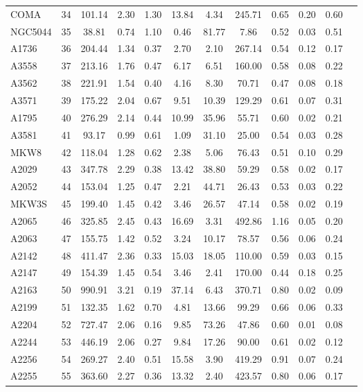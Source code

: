 \documentclass[10pt,aps,pra,reprint,amsmath,amsfonts,amssymb,showpacs,nofootinbib,floatfix]{revtex4-1}
\begin{document}
\begin{table}
\begin{minipage}{2.0\columnwidth}
\begin{tabular}{l  c c c c c c c c c c c}
$$COMA     &  34 & 101.14 &   2.30 &   1.30 &  13.84 &   4.34 & 245.71 &   0.65 &   0.20 &   0.60 \\
NGC5044  &  35 &  38.81 &   0.74 &   1.10 &   0.46 &  81.77 &   7.86 &   0.52 &   0.03 &   0.51 \\
A1736    &  36 & 204.44 &   1.34 &   0.37 &   2.70 &   2.10 & 267.14 &   0.54 &   0.12 &   0.17 \\
A3558    &  37 & 213.16 &   1.76 &   0.47 &   6.17 &   6.51 & 160.00 &   0.58 &   0.08 &   0.22 \\
A3562    &  38 & 221.91 &   1.54 &   0.40 &   4.16 &   8.30 &  70.71 &   0.47 &   0.08 &   0.18 \\
A3571    &  39 & 175.22 &   2.04 &   0.67 &   9.51 &  10.39 & 129.29 &   0.61 &   0.07 &   0.31 \\
A1795    &  40 & 276.29 &   2.14 &   0.44 &  10.99 &  35.96 &  55.71 &   0.60 &   0.02 &   0.21 \\
A3581    &  41 &  93.17 &   0.99 &   0.61 &   1.09 &  31.10 &  25.00 &   0.54 &   0.03 &   0.28 \\
MKW8     &  42 & 118.04 &   1.28 &   0.62 &   2.38 &   5.06 &  76.43 &   0.51 &   0.10 &   0.29 \\
A2029    &  43 & 347.78 &   2.29 &   0.38 &  13.42 &  38.80 &  59.29 &   0.58 &   0.02 &   0.17 \\
A2052    &  44 & 153.04 &   1.25 &   0.47 &   2.21 &  44.71 &  26.43 &   0.53 &   0.03 &   0.22 \\
MKW3S    &  45 & 199.40 &   1.45 &   0.42 &   3.46 &  26.57 &  47.14 &   0.58 &   0.02 &   0.19 \\
A2065    &  46 & 325.85 &   2.45 &   0.43 &  16.69 &   3.31 & 492.86 &   1.16 &   0.05 &   0.20 \\
A2063    &  47 & 155.75 &   1.42 &   0.52 &   3.24 &  10.17 &  78.57 &   0.56 &   0.06 &   0.24 \\
A2142    &  48 & 411.47 &   2.36 &   0.33 &  15.03 &  18.05 & 110.00 &   0.59 &   0.03 &   0.15 \\
A2147    &  49 & 154.39 &   1.45 &   0.54 &   3.46 &   2.41 & 170.00 &   0.44 &   0.18 &   0.25 \\
A2163    &  50 & 990.91 &   3.21 &   0.19 &  37.14 &   6.43 & 370.71 &   0.80 &   0.02 &   0.09 \\
A2199    &  51 & 132.35 &   1.62 &   0.70 &   4.81 &  13.66 &  99.29 &   0.66 &   0.06 &   0.33 \\
A2204    &  52 & 727.47 &   2.06 &   0.16 &   9.85 &  73.26 &  47.86 &   0.60 &   0.01 &   0.08 \\
A2244    &  53 & 446.19 &   2.06 &   0.27 &   9.84 &  17.26 &  90.00 &   0.61 &   0.02 &   0.12 \\
A2256    &  54 & 269.27 &   2.40 &   0.51 &  15.58 &   3.90 & 419.29 &   0.91 &   0.07 &   0.24 \\
A2255    &  55 & 363.60 &   2.27 &   0.36 &  13.32 &   2.40 & 423.57 &   0.80 &   0.06 &   0.17 \\
\end{tabular}
\end{minipage}
\end{table} 
\end{document}
